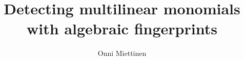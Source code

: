\documentclass[12pt,a4paper,finnish,oneside]{article}
\begin{document}



\pagestyle{plain}


%
%

\author{Onni Miettinen}

\title{Detecting multilinear monomials with algebraic fingerprints}

\end{document}
